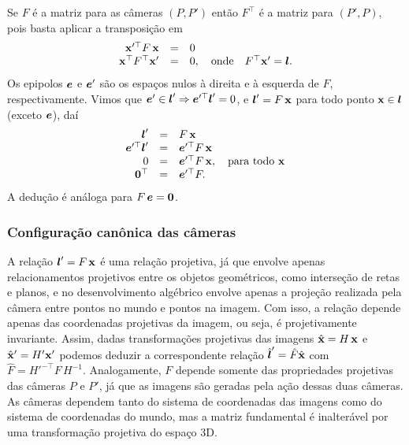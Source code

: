 Se $F$ é a matriz para as câmeras $(P,P')$ então $F^\top$ é a matriz para $(P',P)$, pois basta aplicar a transposição em 
\begin{equation*}
\begin{array}{rcl}
\mathbf{x}'^\top F\,\mathbf{x}&=&0\\
\mathbf{x}^\top F^\top\mathbf{x}'&=&0,\quad\text{onde}\quad F^\top\mathbf{x}'=\boldsymbol{l}.
\end{array}
\end{equation*}
Os epipolos $\boldsymbol{e}$ e $\boldsymbol{e}'$ são os espaços nulos à direita e à esquerda de $F$, respectivamente. Vimos que $\boldsymbol{e}'\in\boldsymbol{l}'\Rightarrow\boldsymbol{e}'^\top\boldsymbol{l}'=0$, e $\boldsymbol{l}'=F\,\mathbf{x}$ para todo ponto $\mathbf{x}\in\boldsymbol{l}$ (exceto $\boldsymbol{e}$), daí
\begin{equation*}
\begin{array}{rcl}
\boldsymbol{l}'&=&F\,\mathbf{x}\\
\boldsymbol{e}'^\top\boldsymbol{l}'&=&\boldsymbol{e}'^\top F\,\mathbf{x}\\
0&=&\boldsymbol{e}'^\top F\,\mathbf{x},\quad\text{para todo}\,\,\mathbf{x}\\
{\bf 0}^\top&=&\boldsymbol{e}'^\top F.
\end{array}
\end{equation*} 
A dedução é análoga para $F\,\boldsymbol{e}={\bf 0}$.

\subsubsection{Configuração canônica das câmeras}\label{sec.cameras-canonicas}
A relação $\boldsymbol{l}'=F\,\mathbf{x}$ é uma relação projetiva, já que envolve apenas relacionamentos projetivos entre os objetos geométricos, como interseção de retas e planos, e no desenvolvimento algébrico envolve apenas a projeção realizada pela câmera entre pontos no mundo e pontos na imagem. Com isso, a relação depende apenas das coordenadas projetivas da imagem, ou seja, é projetivamente invariante. Assim, dadas transformações projetivas das imagens $\hat{\mathbf{x}}=H\,\mathbf{x}$ e $\hat{\mathbf{x}}'=H'\mathbf{x}'$ podemos deduzir a correspondente relação $\hat{\boldsymbol{l}}'=\hat{F}\hat{\mathbf{x}}$ com $\hat{F}=H'^{-\top}F\,H^{-1}$. Analogamente, $F$ depende somente das propriedades projetivas das câmeras $P$ e $P'$, já que as imagens são geradas pela ação dessas duas câmeras. As câmeras dependem tanto do sistema de coordenadas das imagens como do sistema de coordenadas do mundo, mas a matriz fundamental é inalterável por uma transformação projetiva do espaço 3D. 

